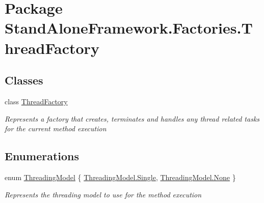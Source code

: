 \hypertarget{namespace_stand_alone_framework_1_1_factories_1_1_thread_factory}{\section{Package Stand\+Alone\+Framework.\+Factories.\+Thread\+Factory}
\label{namespace_stand_alone_framework_1_1_factories_1_1_thread_factory}
}
\subsection*{Classes}
\begin{DoxyCompactItemize}
\item 
class \hyperlink{class_stand_alone_framework_1_1_factories_1_1_thread_factory_1_1_thread_factory}{Thread\+Factory}
\begin{DoxyCompactList}\small\item\em Represents a factory that creates, terminates and handles any thread related tasks for the current method execution \end{DoxyCompactList}\end{DoxyCompactItemize}
\subsection*{Enumerations}
\begin{DoxyCompactItemize}
\item 
enum \hyperlink{namespace_stand_alone_framework_1_1_factories_1_1_thread_factory_aaa02326f96ee10b7d0fd360488d27c39}{Threading\+Model} \{ \hyperlink{namespace_stand_alone_framework_1_1_factories_1_1_thread_factory_aaa02326f96ee10b7d0fd360488d27c39a66ba162102bbf6ae31b522aec561735e}{Threading\+Model.\+Single}, 
\hyperlink{namespace_stand_alone_framework_1_1_factories_1_1_thread_factory_aaa02326f96ee10b7d0fd360488d27c39a6adf97f83acf6453d4a6a4b1070f3754}{Threading\+Model.\+None}
 \}
\begin{DoxyCompactList}\small\item\em Represents the threading model to use for the method execution \end{DoxyCompactList}\end{DoxyCompactItemize}


